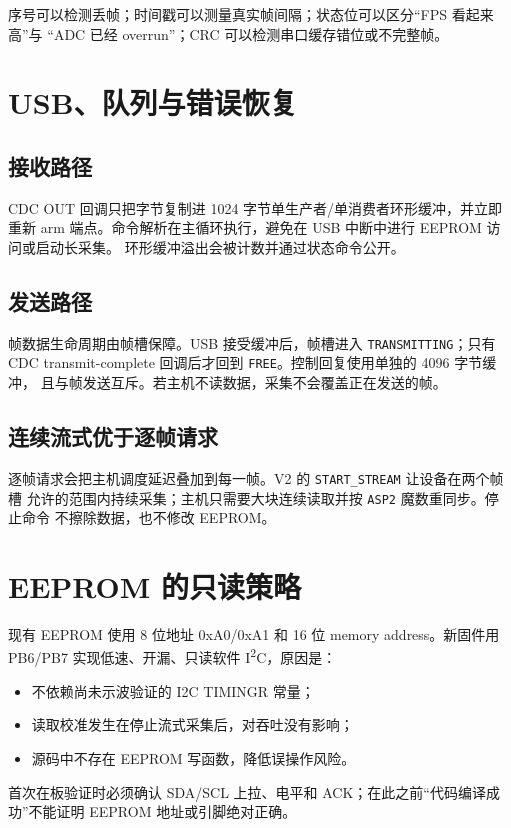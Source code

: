 \documentclass[UTF8,fontset=windows,11pt]{ctexart}
\newcommand{\code}[1]{\texttt{#1}}
\begin{document}
序号可以检测丢帧；时间戳可以测量真实帧间隔；状态位可以区分“FPS 看起来高”与
“ADC 已经 overrun”；CRC 可以检测串口缓存错位或不完整帧。

\section{USB、队列与错误恢复}

\subsection{接收路径}

CDC OUT 回调只把字节复制进 1024 字节单生产者/单消费者环形缓冲，并立即重新 arm
端点。命令解析在主循环执行，避免在 USB 中断中进行 EEPROM 访问或启动长采集。
环形缓冲溢出会被计数并通过状态命令公开。

\subsection{发送路径}

帧数据生命周期由帧槽保障。USB 接受缓冲后，帧槽进入 \code{TRANSMITTING}；只有
CDC transmit-complete 回调后才回到 \code{FREE}。控制回复使用单独的 4096 字节缓冲，
且与帧发送互斥。若主机不读数据，采集不会覆盖正在发送的帧。

\subsection{连续流式优于逐帧请求}

逐帧请求会把主机调度延迟叠加到每一帧。V2 的 \code{START\_STREAM} 让设备在两个帧槽
允许的范围内持续采集；主机只需要大块连续读取并按 \code{ASP2} 魔数重同步。停止命令
不擦除数据，也不修改 EEPROM。

\section{EEPROM 的只读策略}

现有 EEPROM 使用 8 位地址 0xA0/0xA1 和 16 位 memory address。新固件用 PB6/PB7
实现低速、开漏、只读软件 I\textsuperscript{2}C，原因是：
\begin{itemize}
  \item 不依赖尚未示波验证的 I2C TIMINGR 常量；
  \item 读取校准发生在停止流式采集后，对吞吐没有影响；
  \item 源码中不存在 EEPROM 写函数，降低误操作风险。
\end{itemize}
首次在板验证时必须确认 SDA/SCL 上拉、电平和 ACK；在此之前“代码编译成功”不能证明
EEPROM 地址或引脚绝对正确。
\end{document}
